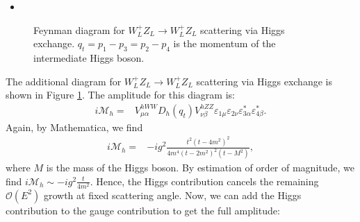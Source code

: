 \begin{itemize}
    \item [(b)]
\end{itemize}
\begin{figure}
    \centering
    \caption{Feynman diagram for $W^+_L Z_L \to W^+_L Z_L$ scattering via Higgs exchange. $q_t = p_1 - p_3 = p_2 - p_4$ is the momentum of the intermediate Higgs boson.}
    \label{HW4:w-z-scattering-higgs-exchange}
\end{figure}
The additional diagram for $W^+_L Z_L \to W^+_L Z_L$ scattering via Higgs exchange is shown in Figure \ref{HW4:w-z-scattering-higgs-exchange}. The amplitude for this diagram is:
\begin{align}
    i\mathcal{M}_h =& V^{hWW}_{\mu\alpha} D_h(q_t) V^{hZZ}_{\nu\beta} \varepsilon_{1\mu} \varepsilon_{2\nu} \varepsilon_{3\alpha}^* \varepsilon_{4\beta}^*.
\end{align}
Again, by Mathematica, we find
\begin{align}
    i\mathcal{M}_h =& -ig^2\frac{t^2 \left(t-4 m^2\right)^2}{4m^4 \left( t-2 m^2\right)^2 \left(t-M^2\right)},
\end{align}
where $M$ is the mass of the Higgs boson. By estimation of order of magnitude, we find $i\mathcal{M}_h \sim -ig^2\frac{t}{4m^2}$. Hence, the Higgs contribution cancels the remaining $\mathcal{O}(E^2)$ growth at fixed scattering angle. Now, we can add the Higgs contribution to the gauge contribution to get the full amplitude:

